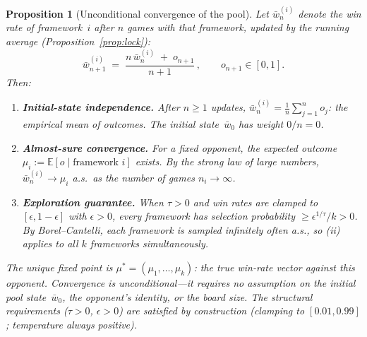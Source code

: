 \documentclass[11pt,a4paper]{article}
\newtheorem{proposition}[theorem]{Proposition}
\begin{document}
\begin{proposition}[Unconditional convergence of the pool]%
\label{prop:contraction}
Let $\bar{w}_n^{(i)}$ denote the win rate of framework~$i$
after $n$ games with that framework, updated by the
running average (Proposition~\ref{prop:lock}):
\begin{equation}\label{eq:running-avg}
  \bar{w}_{n+1}^{(i)}
  \;=\;
  \frac{n\,\bar{w}_n^{(i)} \;+\; o_{n+1}}{n+1}\,,
  \qquad o_{n+1} \in [0,1].
\end{equation}
Then:
\begin{enumerate}[label=\textup{(\roman*)}, nosep]
\item \textbf{Initial-state independence.}\;
  After $n \geq 1$ updates,
  $\bar{w}_n^{(i)} = \frac{1}{n}\sum_{j=1}^{n} o_j$:
  the empirical mean of outcomes.
  The initial state~$\bar{w}_0$ has weight $0/n = 0$.

\item \textbf{Almost-sure convergence.}\;
  For a fixed opponent, the expected outcome
  $\mu_i := \mathbb{E}[o \mid \text{framework } i]$ exists.
  By the strong law of large numbers,
  $\bar{w}_{n}^{(i)} \to \mu_i$ a.s.\
  as the number of games $n_i \to \infty$.

\item \textbf{Exploration guarantee.}\;
  When $\tau > 0$ and win rates are clamped to
  $[\epsilon, 1{-}\epsilon]$ with $\epsilon > 0$,
  every framework has selection probability
  $\geq \epsilon^{1/\tau}/k > 0$.
  By Borel--Cantelli, each framework is sampled
  infinitely often a.s., so \textup{(ii)} applies
  to all $k$ frameworks simultaneously.
\end{enumerate}

\noindent
The unique fixed point is
$\mu^* = (\mu_1, \ldots, \mu_k)$:
the true win-rate vector against this opponent.
Convergence is \emph{unconditional}---it requires
no assumption on the initial pool state~$\bar{w}_0$,
the opponent's identity, or the board size.
The structural requirements ($\tau > 0$, $\epsilon > 0$)
are satisfied by construction
(clamping to $[0.01, 0.99]$; temperature always positive).
\end{proposition}
\end{document}
